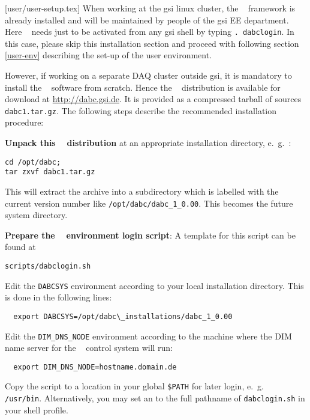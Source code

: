 [user/user-setup.tex]
\label{user-setup-chapter}
When working at the gsi linux cluster, the \dabc~ framework is already installed and will
be maintained by people of the gsi EE department. Here \dabc~ needs just to be
activated from any gsi shell by typing {\tt . dabclogin}. In this case, 
please skip this installation section and proceed with following section \ref{user-env} describing
the set-up of the user environment.

However, if working on a separate DAQ cluster outside gsi, 
it is mandatory to install the \dabc~ software
from scratch. 
Hence the \dabc~ distribution is available for download at \hyperref{http://dabc.gsi.de}{}{}{http://dabc.gsi.de}.
It is provided as a compressed tarball of sources {\tt dabc1.tar.gz}.
The following steps describe the recommended installation procedure:

\bnum
\item {\bf Unpack this \dabc~ distribution} at an appropriate installation directory,
e.~g.~:
\begin{verbatim}
cd /opt/dabc; 
tar zxvf dabc1.tar.gz
\end{verbatim}
This will extract the archive into a subdirectory which is labelled
with the current version number like {\tt /opt/dabc/dabc\_1\_0.00}.
This becomes the future \dabc~ system directory.

\item {\bf Prepare the \dabc~ environment login script}:
A template for this script can be found at  
\begin{verbatim}
scripts/dabclogin.sh
\end{verbatim}


\bbul
  \item Edit the {\tt DABCSYS} environment according to your local installation directory. 
  This is done in the following lines:
  \begin{verbatim}
  export DABCSYS=/opt/dabc\_installations/dabc_1_0.00  
  \end{verbatim}  
  
  \item Edit the {\tt DIM\_DNS\_NODE} environment according to the machine where 
  the DIM name server \cite{DIM} for the \dabc~ control system will run:
   \begin{verbatim}
  export DIM_DNS_NODE=hostname.domain.de
  \end{verbatim}  
  \item Copy the script to a location in your global {\tt \$PATH} for later login,
  e.~g.~ {\tt /usr/bin}. Alternatively, you
  may set an  to the full pathname of {\tt dabclogin.sh} in your shell profile.
\ebul

